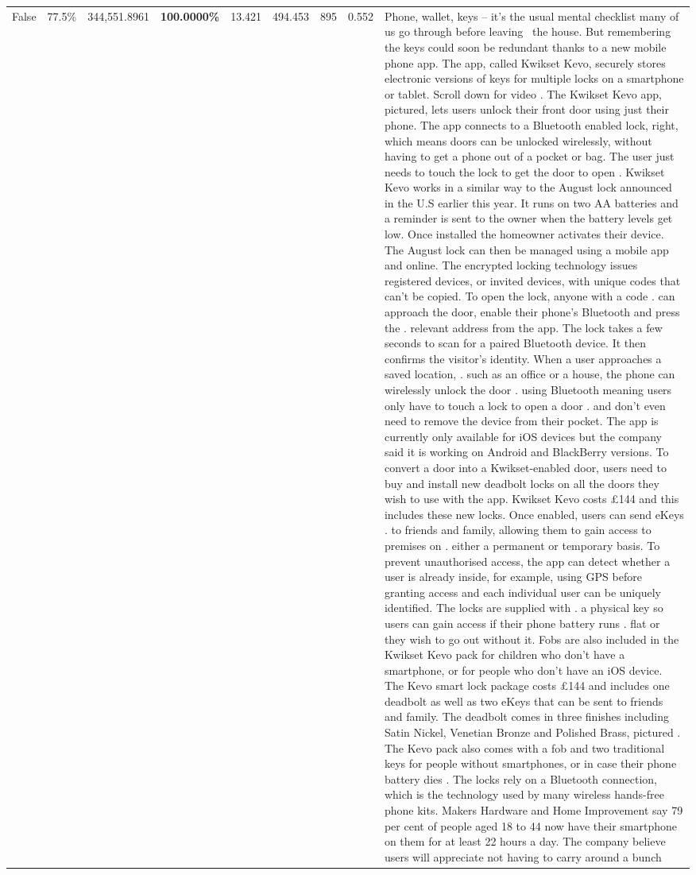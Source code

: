 \begin{table}[H]
\begin{tabular}{lllrlllll}
False & 77.5\% & 344,551.8961 & \bfseries \color{red} 100.0000\% & 13.421 & 494.453 & 895 & 0.552 & Phone, wallet, keys – it’s the usual mental checklist many of us go through before leaving  the house. But remembering the keys could soon be redundant thanks to a new mobile phone app. The app, called Kwikset Kevo, securely stores electronic versions of keys for multiple locks on a smartphone or tablet. Scroll down for video . The Kwikset Kevo app, pictured, lets users unlock their front door using just their phone. The app connects to a Bluetooth enabled lock, right, which means doors can be unlocked wirelessly, without having to get a phone out of a pocket or bag. The user just needs to touch the lock to get the door to open . Kwikset Kevo works in a similar way to the August lock announced in the U.S earlier this year. It runs on two AA batteries and a reminder is sent to the owner when the battery levels get low. Once installed the homeowner activates their device. The August lock can then be managed using a mobile app and online. The encrypted locking technology issues registered devices, or invited devices, with unique codes that can't be copied. To open the lock, anyone with a code . can approach the door, enable their phone's Bluetooth and press the . relevant address from the app. The lock takes a few seconds to scan for a paired Bluetooth device. It then confirms the visitor's identity. When a user approaches a saved location, . such as an office or a house, the phone can wirelessly unlock the door . using Bluetooth meaning users only have to touch a lock to open a door . and don't even need to remove the device from their pocket. The app is currently only available for iOS devices but the company said it is working on Android and BlackBerry versions. To convert a door into a Kwikset-enabled door, users need to buy and install new deadbolt locks on all the doors they wish to use with the app. Kwikset Kevo costs £144 and this includes these new locks. Once enabled, users can send eKeys . to friends and family, allowing them to gain access to premises on . either a permanent or temporary basis. To prevent unauthorised access, the app can detect whether a user is already inside, for example, using GPS before granting access and each individual user can be uniquely identified. The locks are supplied with . a physical key so users can gain access if their phone battery runs . flat or they wish to go out without it. Fobs are also included in the Kwikset Kevo pack for children who don't have a smartphone, or for people who don't have an iOS device. The Kevo smart lock package costs £144 and includes one deadbolt as well as two eKeys that can be sent to friends and family. The deadbolt comes in three finishes including Satin Nickel, Venetian Bronze and Polished Brass, pictured . The Kevo pack also comes with a fob and two traditional keys for people without smartphones, or in case their phone battery dies . The locks rely on a Bluetooth connection, which is the technology used by many wireless hands-free phone kits. Makers Hardware and Home Improvement say 79 per cent of people aged 18 to 44 now have their smartphone on them for at least 22 hours a day. The company believe users will appreciate not having to carry around a bunch 
\end{tabular}
\end{table}
